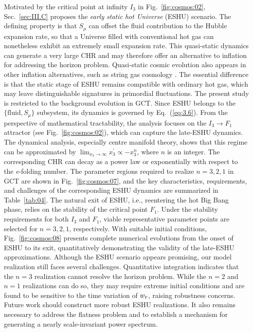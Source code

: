 \documentclass[aps,prd,twocolumn]{revtex4-2}
\newcommand\subF{\textsc{f}}
\begin{document}
Motivated by the critical point at infinity $I_3$ in Fig.~\ref{fig:cosmos:02}, Sec.~\ref{sec:III.C} proposes the \textit{early static hot Universe} (ESHU) scenario. The defining property is that $S_\mu$ can offset the fluid contribution to the Hubble expansion rate, so that a Universe filled with conventional hot gas can nonetheless exhibit an extremely small expansion rate. This quasi-static dynamics can generate a very large CHR and may therefore offer an alternative to inflation for addressing the horizon problem. Quasi-static cosmic evolution also appears in other inflation alternatives, such as string gas cosmology \cite{Tseytlin1992.NuclPhysB.372.443,Nayeri2006.PRL.97.021302}. The essential difference is that the static stage of ESHU remains compatible with ordinary hot gas, which may leave distinguishable signatures in primordial fluctuations. The present study is restricted to the background evolution in GCT. Since ESHU belongs to the $\{\mathrm{fluid},S_\mu\}$ subsystem, its dynamics is governed by Eq.~(\ref{eq:3.6}). From the perspective of mathematical tractability, the analysis focuses on the $I_3\rightarrow F_1$ attractor (see Fig.~\ref{fig:cosmos:02}), which can capture the late-ESHU dynamics. The dynamical analysis, especially centre manifold theory, shows that this regime can be approximated by $\lim_{x_3\rightarrow\infty}x_3^\prime\propto-x_3^n$, where $n$ is an integer. The corresponding CHR can decay as a power law or exponentially with respect to the \textit{e}-folding number. The parameter regions required to realize $n=3,2,1$ in GCT are shown in Fig.~\ref{fig:cosmos:07}, and the key characteristics, requirements, and challenges of the corresponding ESHU dynamics are summarized in Table~\ref{tab:04}. The natural exit of ESHU, i.e., reentering the hot Big Bang phase, relies on the stability of the critical point $F_1$. Under the stability requirements for both $I_3$ and $F_1$, viable representative parameter points are selected for $n=3,2,1$, respectively. With suitable initial conditions, Fig.~\ref{fig:cosmos:08} presents complete numerical evolutions from the onset of ESHU to its exit, quantitatively demonstrating the validity of the late-ESHU approximations. Although the ESHU scenario appears promising, our model realization still faces several challenges. Quantitative integration indicates that the $n=3$ realization cannot resolve the horizon problem. While the $n=2$ and $n=1$ realizations can do so, they may require extreme initial conditions and are found to be sensitive to the time variation of $w_\subF$, raising robustness concerns. Future work should construct more robust ESHU realizations. It also remains necessary to address the flatness problem and to establish a mechanism for generating a nearly scale-invariant power spectrum.
\end{document}
